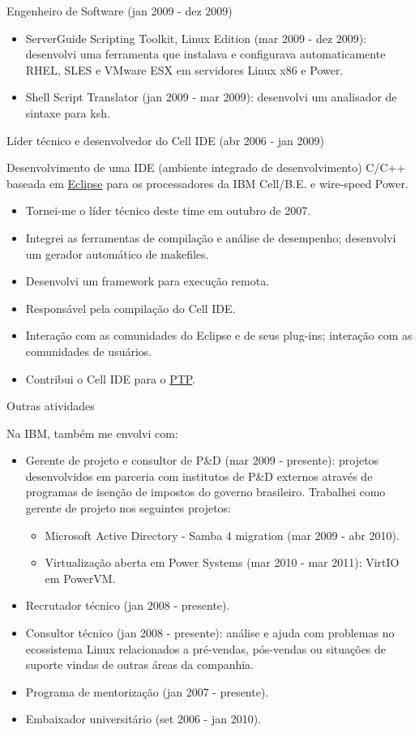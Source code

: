\documentclass[10pt]{article} %
\begin{document}
\job
{Engenheiro de Software (jan 2009 - dez 2009)}
{

\begin{itemize}
\item{ServerGuide Scripting Toolkit, Linux Edition (mar 2009 - dez 2009): desenvolvi uma ferramenta que instalava e configurava automaticamente RHEL, SLES e VMware ESX em servidores Linux x86 e Power.}
\item{Shell Script Translator (jan 2009 - mar 2009): desenvolvi um analisador de sintaxe para ksh.}
\end{itemize}

}
\job
{Líder técnico e desenvolvedor do Cell IDE (abr 2006 - jan 2009)}
{Desenvolvimento de uma IDE (ambiente integrado de desenvolvimento) C/C++ baseada em \href{https://eclipse.org/}{Eclipse} para os processadores da IBM Cell/B.E. e wire-speed Power.

\begin{itemize}
\item{Tornei-me o líder técnico deste time em outubro de 2007.}
\item{Integrei as ferramentas de compilação e análise de desempenho; desenvolvi um gerador automático de makefiles.}
\item{Desenvolvi um framework para execução remota.}
\item{Responsável pela compilação do Cell IDE.}
\item{Interação com as comunidades do Eclipse e de seus plug-ins; interação com as comunidades de usuários.}
\item{Contribui o Cell IDE para o \href{http://www.eclipse.org/ptp/}{PTP}.}
\end{itemize}

}
\job
{Outras atividades}
{Na IBM, também me envolvi com:

\begin{itemize}
\item{Gerente de projeto e consultor de P\&D (mar 2009 - presente): projetos desenvolvidos em parceria com institutos de P\&D externos através de programas de isenção de impostos do governo brasileiro. Trabalhei como gerente de projeto nos seguintes projetos:

\begin{itemize}
\item{Microsoft Active Directory - Samba 4 migration (mar 2009 - abr 2010).}
\item{Virtualização aberta em Power Systems (mar 2010 - mar 2011): VirtIO em PowerVM.}
\end{itemize}

}
\item{Recrutador técnico (jan 2008 - presente).}
\item{Consultor técnico (jan 2008 - presente): análise e ajuda com problemas no ecossistema Linux relacionados a pré-vendas, pós-vendas ou situações de suporte vindas de outras áreas da companhia.}
\item{Programa de mentorização (jan 2007 - presente).}
\item{Embaixador universitário (set 2006 - jan 2010).}
\end{itemize}

}
\end{document}
